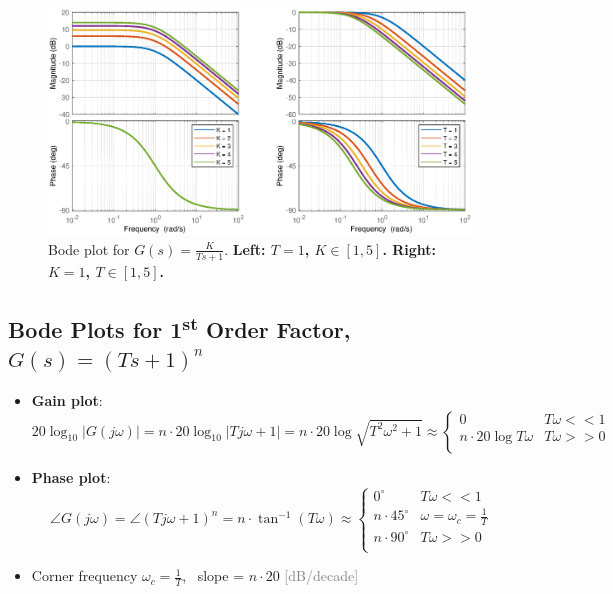 \begin{itemize}
\begin{figure}[H]
    \centering 
    \includegraphics[width=1\textwidth]{images/bode3.eps}
    \caption{Bode plot for $G(s) = \frac{K}{Ts+1}$. \textbf{Left: $T=1$, $K\in [1,5]$. Right: $K=1$, $T\in [1,5]$.}}
\end{figure}
\end{itemize}

\subsection{Bode Plots for 1\textsuperscript{st} Order Factor, $G(s) = (Ts+1)^{n}$}
\begin{itemize}
\item \textbf{Gain plot}:
\[20\log_{10}\lvert G(j\omega) \rvert  = n\cdot 20\log_{10} \lvert Tj\omega+1 \rvert =n\cdot20\log\sqrt{T^{2}\omega^{2}+1}\approx \begin{cases}
0 & T\omega<<1\\
n\cdot 20\log T\omega & T\omega>>0\\
\end{cases}\]
\item \textbf{Phase plot}:
\[\angle G(j\omega) = \angle (Tj\omega+1)^{n} = n\cdot \tan^{-1}(T\omega) \approx \begin{cases}
0^{\circ} & T\omega<<1\\
n\cdot 45^{\circ}& \omega=\omega_{c}=\frac{1}{T}\\
n\cdot 90^{\circ}& T\omega>>0\\
\end{cases}\]
\item Corner frequency $\omega_{c} = \frac{1}{T}$, \ slope = $n\cdot 20$ \textcolor{gray}{[dB/decade]}
\end{itemize}

